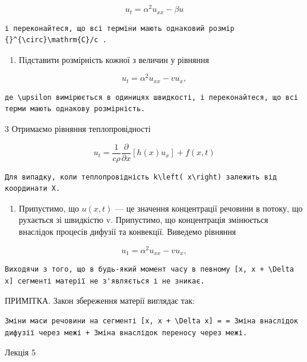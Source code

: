 \documentclass[
  ukrainian,
]{article}
\providecommand{\tightlist}{%
  \setlength{\itemsep}{0pt}\setlength{\parskip}{0pt}}
\begin{document}
\[
u_t = \alpha^2 u_{xx} - \beta u
\]

\begin{verbatim}
і переконайтеся, що всі терміни мають однаковий розмір {}^{\circ}\mathrm{C}/c .
\end{verbatim}

\begin{enumerate}
\def\labelenumi{\arabic{enumi}.}
\setcounter{enumi}{1}
\tightlist
\item
  Підставити розмірність кожної з величин у рівняння
\end{enumerate}

\[
u_t = \alpha^2 u_{xx} - v u_x,
\]

\begin{verbatim}
де \upsilon вимірюється в одиницях швидкості, і переконайтеся, що всі терми мають однакову розмірність.
\end{verbatim}

3 Отримаємо рівняння теплопровідності

\[
u_{t} = \frac{1}{c\rho} \frac{\partial}{\partial x} [h(x) u_{x}] + f(x, t)
\]

\begin{verbatim}
Для випадку, коли теплопровідність k\left( x\right) залежить від координати X.
\end{verbatim}

\begin{enumerate}
\def\labelenumi{\arabic{enumi}.}
\setcounter{enumi}{3}
\tightlist
\item
  Припустимо, що \(u(x, t)\) --- це значення концентрації речовини в
  потоку, що рухається зі швидкістю v. Припустимо, що концентрація
  змінюється внаслідок процесів дифузії та конвекції. Виведемо рівняння
\end{enumerate}

\[
u_1 = \alpha^2 u_{xx} - v u_x,
\]

\begin{verbatim}
Виходячи з того, що в будь-який момент часу в певному [x, x + \Delta x] сегменті матерії не з'являється і не зникає.
\end{verbatim}

ПРИМІТКА. Закон збереження матерії виглядає так:

\begin{verbatim}
Зміни маси речовини на сегменті [x, x + \Delta x] = = Зміна внаслідок дифузії через межі + Зміна внаслідок переносу через межі.
\end{verbatim}

Лекція 5
\end{document}
